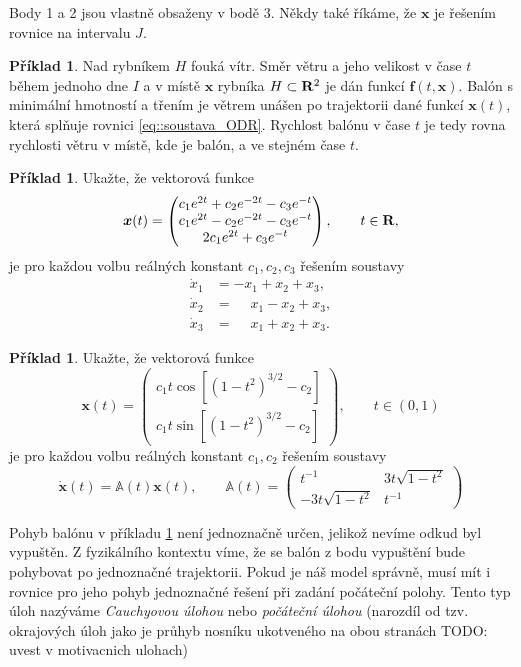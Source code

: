\documentclass[a4paper, 12pt]{book}
\theoremstyle{definition}
\newtheorem{example}[theorem]{Příklad}
\def\Real{{\rm\bf R}}
\def\vc#1{\mathbf{\boldsymbol{#1}}}     %
\def\tn#1{{\mathbb{#1}}}    %
\def\todo#1{{\color{green}TODO:} #1}
\begin{document}
Body 1 a 2 jsou vlastně obsaženy v bodě 3.
Někdy také říkáme, že $\vc x$ je řešením rovnice na intervalu $J$.

\begin{example}
\label{balon}
Nad rybníkem $H$ fouká vítr. Směr větru a jeho velikost v čase $t$ během jednoho dne $I$ a v místě $\vc x$ rybníka  $H\subset \Real^2$
je dán funkcí $\vc f(t, \vc x)$. Balón s minimální hmotností a třením je větrem unášen po trajektorii dané funkcí $\vc x(t)$,
která splňuje rovnici \eqref{eq::soustava_ODR}. 
Rychlost balónu v čase $t$ je tedy rovna rychlosti větru v místě, kde je balón, a ve stejném čase $t$.
\end{example}


\begin{example}
Ukažte, že vektorová funkce
\[
\vc x(t) = \begin{pmatrix}
c_1 e^{2t} + c_2 e^{-2t} - c_3 e^{-t}\\
c_1 e^{2t} - c_2 e^{-2t} - c_3 e^{-t}\\
2c_1 e^{2t} + c_3 e^{-t}
\end{pmatrix}, \qquad t\in \Real,
\]
je pro každou volbu reálných konstant $c_1, c_2, c_3$ řešením soustavy
\begin{align*}
\dot x_1 &= -x_1 + x_2 + x_3,\\
\dot x_2 &= \phantom{-}x_1 - x_2 + x_3,\\
\dot x_3 &= \phantom{-}x_1 + x_2 + x_3. 
\end{align*}
\end{example}

\begin{example}
Ukažte, že vektorová funkce
\[
\vc x(t) = \begin{pmatrix}
c_1 t \cos [(1-t^2)^{3/2}-c_2]\\
c_1 t \sin [(1-t^2)^{3/2}-c_2]
\end{pmatrix}, \qquad t\in(0, 1)
\]
je pro každou volbu reálných konstant $c_1, c_2$ řešením soustavy
\[
\dot{\vc x}(t) = \tn A(t) \vc x(t),\qquad
\tn A(t)=\begin{pmatrix}
t^{-1}  &  3t\sqrt{1-t^2}\\
-3t\sqrt{1-t^2} & t^{-1}
\end{pmatrix}
\]
\end{example}

Pohyb balónu v příkladu \ref{balon} není jednoznačně určen, jelikož nevíme odkud byl vypuštěn. 
Z fyzikálního kontextu víme, že se balón z bodu vypuštění bude pohybovat po jednoznačné trajektorii. Pokud je 
náš model správně, musí mít i rovnice pro jeho pohyb jednoznačné řešení při zadání počáteční polohy. 
Tento typ úloh nazýváme {\it Cauchyovou úlohou} nebo {\it počáteční úlohou} 
(narozdíl od tzv. okrajových úloh jako je průhyb nosníku ukotveného na obou stranách \todo{uvest v motivacnich ulohach})
\end{document}
